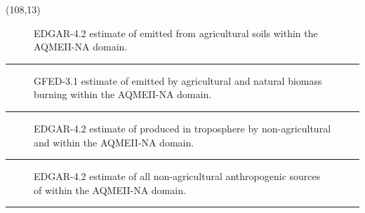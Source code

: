 \documentclass{a0poster} %
\begin{document}
\begin{textblock}{30}(108,13)

\begin{figure}[h!]
  \centering
    \placeholder{838px}{660px}
    \caption{EDGAR-4.2 estimate of  emitted from agricultural soils within the AQMEII-NA domain.}
\end{figure}
\vspace{-20mm}\rule{\textwidth}{1pt}

\begin{figure}[h!]
  \centering
    \placeholder{838px}{660px}
    \caption{GFED-3.1 estimate of  emitted by agricultural and natural biomass burning within the AQMEII-NA domain.}
\end{figure}
\vspace{-20mm}\rule{\textwidth}{1pt}

\begin{figure}[h!]
  \centering
    \placeholder{838px}{660px}
    \caption{EDGAR-4.2 estimate of  produced in troposphere by non-agricultural  and  within the AQMEII-NA domain.}
\end{figure}
\vspace{-20mm}\rule{\textwidth}{1pt}

\begin{figure}[h!]
  \centering
    \placeholder{838px}{660px}
    \caption{EDGAR-4.2 estimate of all non-agricultural anthropogenic sources of  within the AQMEII-NA domain.}
\end{figure}
\vspace{-20mm}\rule{\textwidth}{1pt}

\end{textblock} %
\end{document}
